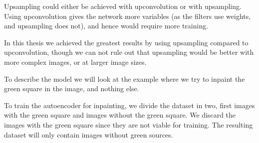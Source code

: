 Upsampling could either be achieved with upconvolution or with upsampling.
Using upconvolution gives the network more variables (as the filters use weights, and upsampling does not), and hence would require more training. 

In this thesis we achieved the greatest results by using upsampling compared to upconvolution, though we can not rule out that upsampling would be better with more complex images, or at larger image sizes.

\vspace{5px}

To describe the model we will look at the example where we try to inpaint the green square in the image, and nothing else.

To train the autoencoder for inpainting, we divide the dataset in two, first images with the green square and images without the green square. We discard the images with the green square since they are not viable for training. 
The resulting dataset will only contain images without green sources.

